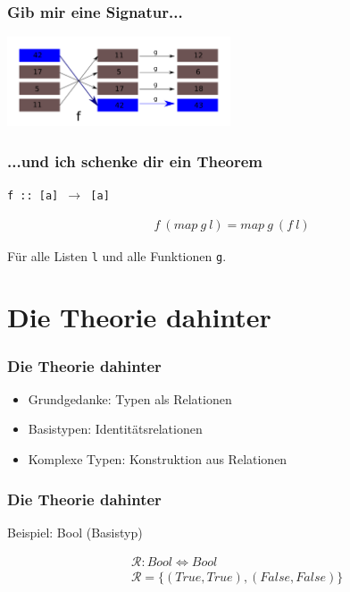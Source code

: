\documentclass{beamer}
\begin{document}
\begin{frame}
\frametitle{Gib mir eine Signatur...}

\begin{center}
\includegraphics[width=250px]{fmapg}
\end{center}
\end{frame}

\begin{frame}
\frametitle{...und ich schenke dir ein Theorem}
\begin{center}
\texttt{f :: [a] $\rightarrow$ [a]}

\begin{align*}
f\ (map\ g\ l) = map\ g\ (f\ l)
\end{align*}

Für alle Listen \texttt{l} und alle Funktionen \texttt{g}.

\end{center}
\end{frame}

\section{Die Theorie dahinter}
\begin{frame}
\frametitle{Die Theorie dahinter}

\begin{itemize}
\item Grundgedanke: Typen als Relationen
\item Basistypen: Identitätsrelationen
\item Komplexe Typen: Konstruktion aus Relationen
\end{itemize}

\end{frame}

\begin{frame}
\frametitle{Die Theorie dahinter}

Beispiel: Bool (Basistyp)

\begin{align*}
&\mathcal{R} : Bool \Leftrightarrow Bool\\
&\mathcal{R} = \{ (True, True), (False, False) \}
\end{align*}

\end{frame}
\end{document}

